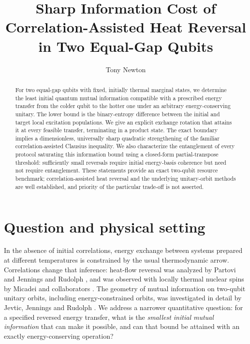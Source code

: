 \documentclass[11pt,a4paper]{article}
\title{\textbf{Sharp Information Cost of Correlation-Assisted Heat Reversal}\\in Two Equal-Gap Qubits}
\author{Tony Newton}
\date{}
\begin{document}
\maketitle
\begin{abstract}
For two equal-gap qubits with fixed, initially thermal marginal states, we determine the least initial quantum mutual information compatible with a prescribed energy transfer from the colder qubit to the hotter one under an arbitrary energy-conserving unitary. The lower bound is the binary-entropy difference between the initial and target local excitation populations. We give an explicit exchange rotation that attains it at every feasible transfer, terminating in a product state. The exact boundary implies a dimensionless, universally sharp quadratic strengthening of the familiar correlation-assisted Clausius inequality. We also characterize the entanglement of every protocol saturating this information bound using a closed-form partial-transpose threshold: sufficiently small reversals require initial energy-basis coherence but need not require entanglement. These statements provide an exact two-qubit resource benchmark; correlation-assisted heat reversal and the underlying unitary-orbit methods are well established, and priority of the particular trade-off is not asserted.
\end{abstract}

\section{Question and physical setting}
In the absence of initial correlations, energy exchange between systems prepared at different temperatures is constrained by the usual thermodynamic arrow. Correlations change that inference: heat-flow reversal was analyzed by Partovi \cite{partovi} and Jennings and Rudolph \cite{jennings}, and was observed with locally thermal nuclear spins by Micadei and collaborators \cite{micadei}. The geometry of mutual information on two-qubit unitary orbits, including energy-constrained orbits, was investigated in detail by Jevtic, Jennings and Rudolph \cite{jevticprl,jevticpra}. We address a narrower quantitative question: for a specified reversed energy transfer, what is the \emph{smallest initial mutual information} that can make it possible, and can that bound be attained with an exactly energy-conserving operation?
\end{document}
